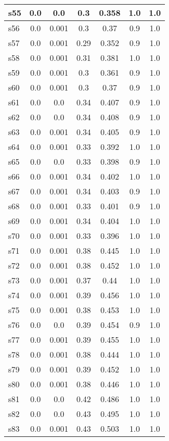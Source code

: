 \documentclass{article}
\begin{document}
\begin{tabular}{|l|c|c|c|c|c|c|}
s55 &0.0 & 0.0 & 0.3 & 0.358 & 1.0 & 1.0\\
\hline
s56 &0.0 & 0.001 & 0.3 & 0.37 & 0.9 & 1.0\\
\hline
s57 &0.0 & 0.001 & 0.29 & 0.352 & 0.9 & 1.0\\
\hline
s58 &0.0 & 0.001 & 0.31 & 0.381 & 1.0 & 1.0\\
\hline
s59 &0.0 & 0.001 & 0.3 & 0.361 & 0.9 & 1.0\\
\hline
s60 &0.0 & 0.001 & 0.3 & 0.37 & 0.9 & 1.0\\
\hline
s61 &0.0 & 0.0 & 0.34 & 0.407 & 0.9 & 1.0\\
\hline
s62 &0.0 & 0.0 & 0.34 & 0.408 & 0.9 & 1.0\\
\hline
s63 &0.0 & 0.001 & 0.34 & 0.405 & 0.9 & 1.0\\
\hline
s64 &0.0 & 0.001 & 0.33 & 0.392 & 1.0 & 1.0\\
\hline
s65 &0.0 & 0.0 & 0.33 & 0.398 & 0.9 & 1.0\\
\hline
s66 &0.0 & 0.001 & 0.34 & 0.402 & 1.0 & 1.0\\
\hline
s67 &0.0 & 0.001 & 0.34 & 0.403 & 0.9 & 1.0\\
\hline
s68 &0.0 & 0.001 & 0.33 & 0.401 & 0.9 & 1.0\\
\hline
s69 &0.0 & 0.001 & 0.34 & 0.404 & 1.0 & 1.0\\
\hline
s70 &0.0 & 0.001 & 0.33 & 0.396 & 1.0 & 1.0\\
\hline
s71 &0.0 & 0.001 & 0.38 & 0.445 & 1.0 & 1.0\\
\hline
s72 &0.0 & 0.001 & 0.38 & 0.452 & 1.0 & 1.0\\
\hline
s73 &0.0 & 0.001 & 0.37 & 0.44 & 1.0 & 1.0\\
\hline
s74 &0.0 & 0.001 & 0.39 & 0.456 & 1.0 & 1.0\\
\hline
s75 &0.0 & 0.001 & 0.38 & 0.453 & 1.0 & 1.0\\
\hline
s76 &0.0 & 0.0 & 0.39 & 0.454 & 0.9 & 1.0\\
\hline
s77 &0.0 & 0.001 & 0.39 & 0.455 & 1.0 & 1.0\\
\hline
s78 &0.0 & 0.001 & 0.38 & 0.444 & 1.0 & 1.0\\
\hline
s79 &0.0 & 0.001 & 0.39 & 0.452 & 1.0 & 1.0\\
\hline
s80 &0.0 & 0.001 & 0.38 & 0.446 & 1.0 & 1.0\\
\hline
s81 &0.0 & 0.0 & 0.42 & 0.486 & 1.0 & 1.0\\
\hline
s82 &0.0 & 0.0 & 0.43 & 0.495 & 1.0 & 1.0\\
\hline
s83 &0.0 & 0.001 & 0.43 & 0.503 & 1.0 & 1.0\\

\end{tabular}
\end{document}
